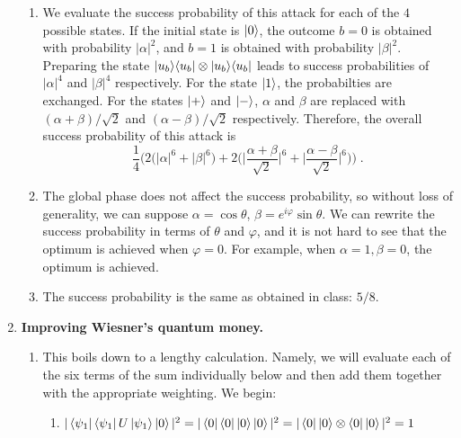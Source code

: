 \documentclass[12pt]{article}
\begin{document}
\begin{enumerate}
\begin{enumerate}
\item We evaluate the success probability of this attack for each of the $4$ possible states. If the initial state is $\ket{0}$, the outcome $b=0$ is obtained with probability $|\alpha|^2$, and $b=1$ is obtained with probability $|\beta|^2$. Preparing the state $\ket{u_b}\!\bra{u_b} \otimes \ket{u_b}\!\bra{u_b}$ leads to success probabilities of $|\alpha|^4$ and $|\beta|^4$ respectively. For the state $\ket{1}$, the probabilties are exchanged. For the states $\ket{+}$ and $\ket{-}$, $\alpha$ and $\beta$ are replaced with $(\alpha + \beta)/\sqrt{2}$ and $(\alpha-\beta)/\sqrt{2}$ respectively. Therefore, the overall success probability of this attack is 
\[ \frac{1}{4}\Big( 2 \big( |\alpha|^6 + |\beta|^6\big) + 2\Big( \Big| \frac{\alpha + \beta}{\sqrt{2}}\Big|^6
+\Big| \frac{\alpha - \beta}{\sqrt{2}}\Big|^6\Big)\Big)\;.\]
\item The global phase does not affect the success probability, so without loss of generality, we can suppose $\alpha = \cos\theta$, $\beta = e^{i\varphi} \sin \theta $. We can rewrite the success probability in terms of $\theta$ and $\varphi$, and it is not hard to see that the optimum is achieved when $\varphi = 0$. For example, when $\alpha= 1, \beta=0$, the optimum is achieved. 
\item The success probability is the same as obtained in class: $5/8$. 
\end{enumerate}



\item {\bf Improving Wiesner's quantum money.}

\begin{enumerate}
\item 
This boils down to a lengthy calculation. Namely, we will evaluate each of the six terms of the sum individually below and then add them together with the appropriate weighting. We begin:
\begin{enumerate}
    \item $|\bra{\psi_1}\bra{\psi_1}U\ket{\psi_1} \ket{0}|^2 = |\bra{0}\bra{0}\ket{0}\ket{0}|^2 = |\bra{0}\ket{0}\otimes \bra{0}\ket{0}|^2 = 1 $
    

\end{enumerate}
\end{enumerate}
\end{enumerate}
\end{document}
